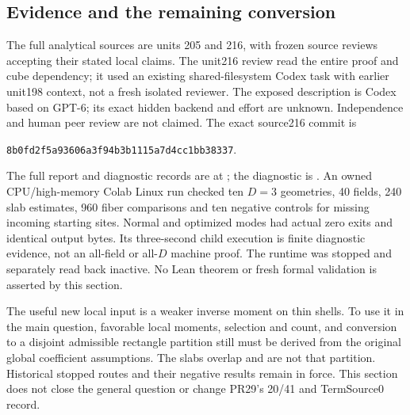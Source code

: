 \subsection{Evidence and the remaining conversion}
The full analytical sources are units 205 and 216, with frozen source
reviews accepting their stated local claims. The unit216 review read the
entire proof and cube dependency; it used an existing shared-filesystem
Codex task with earlier unit198 context, not a fresh isolated reviewer.
The exposed description is Codex based on GPT-6; its exact hidden backend
and effort are unknown. Independence and human peer review are not claimed.
The exact source216 commit is
\begin{center}\scriptsize\texttt{8b0fd2f5a93606a3f94b3b1115a7d4cc1bb38337}.\end{center}
The full report and diagnostic records are at
; the diagnostic is
.
An owned CPU/high-memory Colab Linux run checked ten $D=3$ geometries,
40 fields, 240 slab estimates, 960 fiber comparisons and ten negative
controls for missing incoming starting sites. Normal and optimized modes
had actual zero exits and identical output bytes. Its three-second child
execution is finite diagnostic evidence, not an all-field or all-$D$
machine proof. The runtime was stopped and separately read back inactive.
No Lean theorem or fresh formal validation is asserted by this section.

The useful new local input is a weaker inverse moment on thin shells.
To use it in the main question, favorable local moments, selection and
count, and conversion to a disjoint admissible rectangle partition still
must be derived from the original global coefficient assumptions. The
slabs overlap and are not that partition. Historical stopped routes and
their negative results remain in force. This section does not close the
general question or change PR29's 20/41 and TermSource0 record.
